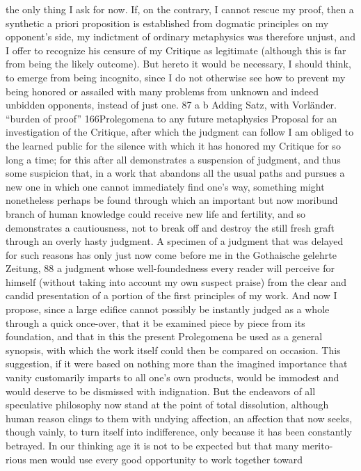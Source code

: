 the only thing I ask for now. If, on the contrary, I cannot rescue my
proof, then a synthetic a priori proposition is established from dogmatic
principles on my opponent’s side, my indictment of ordinary metaphysics
was therefore unjust, and I offer to recognize his censure of my Critique as
legitimate (although this is far from being the likely outcome). But hereto
it would be necessary, I should think, to emerge from being incognito, since
I do not otherwise see how to prevent my being honored or assailed with
many problems from unknown and indeed unbidden opponents, instead
of just one. 87
a
b
Adding Satz, with Vorländer.
“burden of proof”
166Prolegomena to any future metaphysics
Proposal for an investigation of the Critique,
after which the judgment can follow
I am obliged to the learned public for the silence with which it has
honored my Critique for so long a time; for this after all demonstrates
a suspension of judgment, and thus some suspicion that, in a work that
abandons all the usual paths and pursues a new one in which one cannot
immediately ﬁnd one’s way, something might nonetheless perhaps be
found through which an important but now moribund branch of human
knowledge could receive new life and fertility, and so demonstrates a
cautiousness, not to break off and destroy the still fresh graft through an
overly hasty judgment. A specimen of a judgment that was delayed for
such reasons has only just now come before me in the Gothaische gelehrte
Zeitung, 88 a judgment whose well-foundedness every reader will perceive
for himself (without taking into account my own suspect praise) from
the clear and candid presentation of a portion of the ﬁrst principles of
my work.
And now I propose, since a large ediﬁce cannot possibly be instantly
judged as a whole through a quick once-over, that it be examined piece by
piece from its foundation, and that in this the present Prolegomena be used
as a general synopsis, with which the work itself could then be compared
on occasion. This suggestion, if it were based on nothing more than the
imagined importance that vanity customarily imparts to all one’s own
products, would be immodest and would deserve to be dismissed with
indignation. But the endeavors of all speculative philosophy now stand
at the point of total dissolution, although human reason clings to them
with undying affection, an affection that now seeks, though vainly, to turn
itself into indifference, only because it has been constantly betrayed.
In our thinking age it is not to be expected but that many merito-
rious men would use every good opportunity to work together toward
